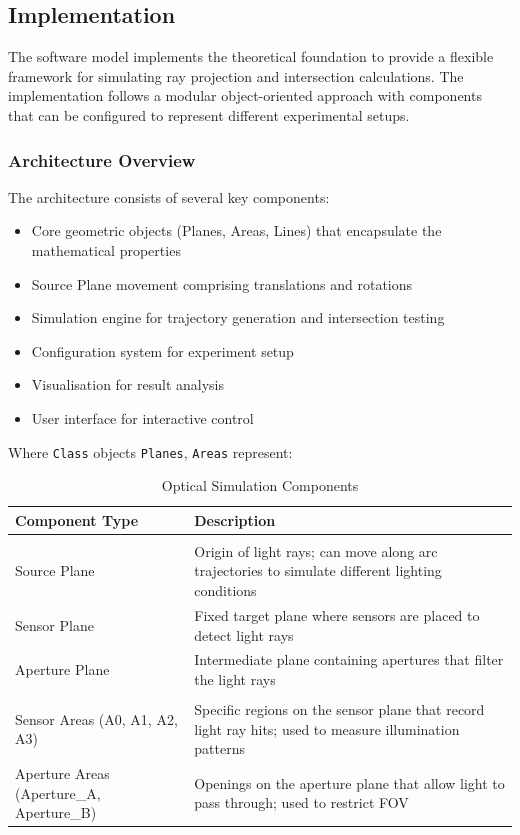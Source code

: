 \subsection{Implementation}

The software model implements the theoretical foundation to provide a flexible framework for simulating ray projection and intersection calculations. The implementation follows a modular object-oriented approach with  components that can be configured to represent different experimental setups.

\subsubsection{Architecture Overview}

The architecture consists of several key components:
\begin{itemize}
\item Core geometric objects (Planes, Areas, Lines) that encapsulate the mathematical properties
\item Source Plane movement comprising translations and rotations
\item Simulation engine for trajectory generation and intersection testing
\item Configuration system for experiment setup
\item Visualisation for result analysis
\item User interface for interactive control
\end{itemize}

Where \texttt{Class} objects \texttt{Planes}, \texttt{Areas} represent:
\begin{table}[h]
    \centering
    \caption{Optical Simulation Components}
    \label{tab:optical_components}
    \begin{tabular}{>{\raggedright\arraybackslash}p{3cm}>{\raggedright\arraybackslash}p{8cm}}
    \toprule
    \textbf{Component Type} & \textbf{Description} \\
    \midrule
    \multicolumn{2}{l}{\textbf{Planes}} \\
    \midrule
    Source Plane & Origin of light rays; can move along arc trajectories to simulate different lighting conditions \\
    Sensor Plane & Fixed target plane where sensors are placed to detect light rays \\
    Aperture Plane & Intermediate plane containing apertures that filter the light rays \\
    \midrule
    \multicolumn{2}{l}{\textbf{Areas}} \\
    \midrule
    Sensor Areas (A0, A1, A2, A3) & Specific regions on the sensor plane that record light ray hits; used to measure illumination patterns \\
    Aperture Areas (Aperture\_A, Aperture\_B) & Openings on the aperture plane that allow light to pass through; used to restrict FOV \\
    \bottomrule
    \end{tabular}
    \end{table}

